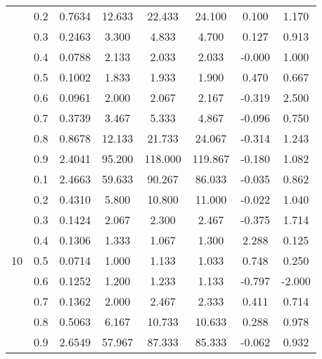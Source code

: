 \documentclass[11pt,a4paper]{report}
\begin{document}
\begin{longtable}{ | c | c || c | c | c | c | c | c | }
 & 0.2 & 0.7634 & 12.633 & 22.433 & 24.100 & 0.100 & 1.170 \\
 & 0.3 & 0.2463 & 3.300 & 4.833 & 4.700 & 0.127 & 0.913 \\
 & 0.4 & 0.0788 & 2.133 & 2.033 & 2.033 & -0.000 & 1.000 \\
 & 0.5 & 0.1002 & 1.833 & 1.933 & 1.900 & 0.470 & 0.667 \\
 & 0.6 & 0.0961 & 2.000 & 2.067 & 2.167 & -0.319 & 2.500 \\
 & 0.7 & 0.3739 & 3.467 & 5.333 & 4.867 & -0.096 & 0.750 \\
 & 0.8 & 0.8678 & 12.133 & 21.733 & 24.067 & -0.314 & 1.243 \\
 & 0.9 & 2.4041 & 95.200 & 118.000 & 119.867 & -0.180 & 1.082 \\
 \hline
\multirow{9}{*}{10} & 0.1 & 2.4663 & 59.633 & 90.267 & 86.033 & -0.035 & 0.862 \\
 & 0.2 & 0.4310 & 5.800 & 10.800 & 11.000 & -0.022 & 1.040 \\
 & 0.3 & 0.1424 & 2.067 & 2.300 & 2.467 & -0.375 & 1.714 \\
 & 0.4 & 0.1306 & 1.333 & 1.067 & 1.300 & 2.288 & 0.125 \\
 & 0.5 & 0.0714 & 1.000 & 1.133 & 1.033 & 0.748 & 0.250 \\
 & 0.6 & 0.1252 & 1.200 & 1.233 & 1.133 & -0.797 & -2.000 \\
 & 0.7 & 0.1362 & 2.000 & 2.467 & 2.333 & 0.411 & 0.714 \\
 & 0.8 & 0.5063 & 6.167 & 10.733 & 10.633 & 0.288 & 0.978 \\
 & 0.9 & 2.6549 & 57.967 & 87.333 & 85.333 & -0.062 & 0.932 \\
 \hline
\hline
\end{longtable}
\end{document}
